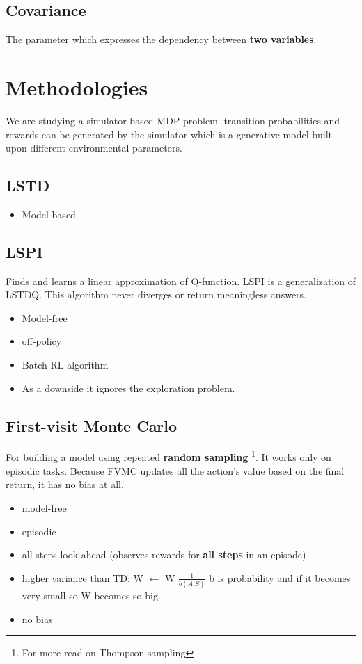 \documentclass[a4paper,12pt]{article}
\begin{document}
\subsection{Covariance}
The parameter which expresses the dependency between \textbf{two variables}.

\section{Methodologies}
We are studying a simulator-based MDP problem. transition probabilities and rewards can be generated by the simulator which is a generative model built upon different environmental parameters.

\subsection{LSTD}
\begin{itemize}
    \item Model-based \cite{Boyan1998}
\end{itemize}

\subsection{LSPI}
Finds and learns a linear approximation of Q-function. LSPI is a generalization of LSTDQ. This algorithm never diverges or return meaningless answers.

\begin{itemize}
    \item Model-free \cite{Lagoudakis2003}
    \item off-policy
    \item Batch RL algorithm
    \item As a downside it ignores the exploration problem.
\end{itemize}

\subsection{First-visit Monte Carlo}
For building a model using repeated \textbf{random sampling} \footnote{For more read on Thompson sampling}. It works only on episodic tasks. Because FVMC updates all the action's value based on the final return, it has no bias at all.
\begin{itemize}
    \item model-free
    \item episodic
    \item  all steps look ahead (observes rewards for \textbf{all steps} in an episode)
    \item higher variance than TD: W $\leftarrow$ W $\frac{1}{b(A|S)}$ b is probability and if it becomes very small so W becomes so big.
    \item no bias
\end{itemize}
\end{document}

